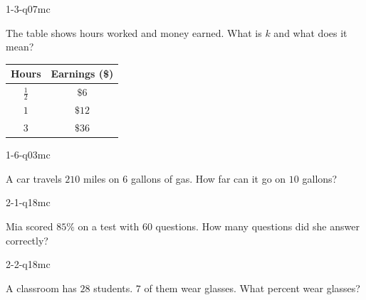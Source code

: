
\begin{practiceQuestion}{1-3-q07}{mc}
\begin{questionText}
The table shows hours worked and money earned. What is $k$ and what does it mean?

\begin{center}
\begin{tabular}{|c|c|}
\hline \textbf{Hours} & \textbf{Earnings (\$)} \\ \hline $\frac{1}{2}$ & $\$6$ \\ $1$ & $\$12$ \\ $3$ & $\$36$ \\ \hline
\end{tabular}
\end{center}
\end{questionText}
\end{practiceQuestion}

\begin{practiceQuestion}{1-6-q03}{mc}
\begin{questionText}
A car travels $210$ miles on $6$ gallons of gas. How far can it go on $10$ gallons?
\end{questionText}
\end{practiceQuestion}

\begin{practiceQuestion}{2-1-q18}{mc}
\begin{questionText}
Mia scored $85\%$ on a test with $60$ questions. How many questions did she answer correctly?
\end{questionText}
\end{practiceQuestion}

\begin{practiceQuestion}{2-2-q18}{mc}
\begin{questionText}
A classroom has $28$ students. $7$ of them wear glasses. What percent wear glasses?
\end{questionText}
\end{practiceQuestion}

